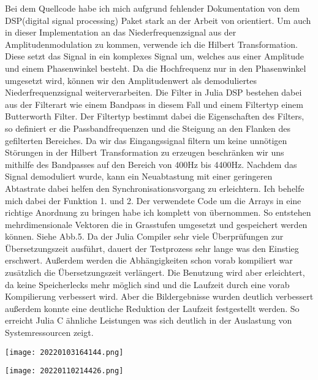 \begin{multicols*}{2}
    Bei dem Quellcode habe ich mich aufgrund fehlender Dokumentation von dem DSP(digital signal processing) Paket stark an der Arbeit von \cite[]{APTDecoder.jl}orientiert. Um auch in dieser Implementation an das Niederfrequenzsignal aus der Amplitudenmodulation zu kommen, verwende ich die Hilbert Transformation. Diese setzt das Signal in ein komplexes Signal um, welches aus einer Amplitude und einem Phasenwinkel besteht. Da die Hochfrequenz nur in den Phasenwinkel umgesetzt wird, können wir den Amplitudenwert als demoduliertes Niederfrequenzsignal weiterverarbeiten. Die Filter in Julia DSP bestehen dabei aus der Filterart wie einem Bandpass in diesem Fall und einem Filtertyp einem Butterworth Filter. Der Filtertyp bestimmt dabei die Eigenschaften des Filters, so definiert er die Passbandfrequenzen und die Steigung an den Flanken des gefilterten Bereiches. Da wir das Eingangssignal filtern um keine unnötigen Störungen in der Hilbert Transformation zu erzeugen beschränken wir uns mithilfe des Bandpasses auf den Bereich von 400Hz bis 4400Hz. Nachdem das Signal demoduliert wurde, kann ein Neuabtastung mit einer geringeren Abtastrate dabei helfen den Synchronisationsvorgang zu erleichtern. Ich behelfe mich dabei der Funktion 1. und 2. Der verwendete Code um die Arrays in eine richtige Anordnung zu bringen habe ich komplett von \cite[]{APTDecoder.jl} übernommen. So entstehen mehrdimensionale Vektoren die in Grasstufen umgesetzt und gespeichert werden können. Siehe Abb.5.
    Da der Julia Compiler sehr viele Überprüfungen zur Übersetzungszeit ausführt, dauert der Testprozess sehr lange was den Einstieg erschwert. Außerdem werden die Abhängigkeiten schon vorab kompiliert war zusätzlich die Übersetzungszeit verlängert. Die Benutzung wird aber erleichtert, da keine Speicherlecks mehr möglich sind und die Laufzeit durch eine vorab Kompilierung verbessert wird. Aber die Bildergebnisse wurden deutlich verbessert außerdem konnte eine deutliche Reduktion der Laufzeit festgestellt werden. So erreicht Julia C ähnliche Leistungen was sich deutlich in der Auslastung von Systemressourcen zeigt. 
\end{multicols*}
    
\begin{center}
    \centering
    \texttt{[image: 20220103164144.png]}
\end{center} 
\begin{center}
    \centering
    \texttt{[image: 20220110214426.png]}
\end{center}


